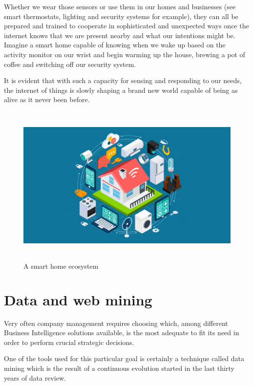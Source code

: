Whether we wear those sensors or use them in our homes and businesses (see smart thermostats, lighting and security systems for example), they can all be prepared and trained to cooperate in sophisticated and unexpected ways once the internet knows that we are present nearby and what our intentions might be. Imagine a smart home capable of knowing when we wake up based on the activity monitor on our wrist and begin warming up the house, brewing a pot of coffee and switching off our security system. 

It is evident that with such a capacity for sensing and responding to our needs,  the internet of things is slowly shaping a brand new world capable of being as alive as it never been before.


\vspace{0.5cm}
\begin{figure}[htbp]
  \centering
    \includegraphics[height=8cm]{images/iot}
  \caption{A smart home ecosystem}
  \label{fig:iot}
\end{figure}
\vspace{0.5cm}

\section{Data and web mining}

Very often company management requires choosing which, among different Business Intelligence solutions available, is the most adequate to fit its need in order to perform crucial strategic decisions.

One of the tools used for this particular goal is certainly a technique called data mining which is the result of a continuous evolution started in the last thirty years of data review.

